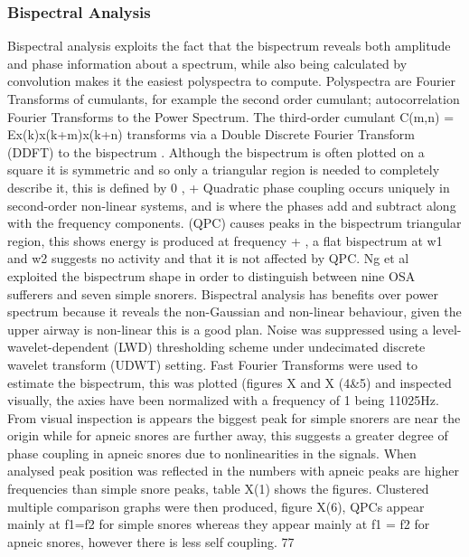 \subsubsection{Bispectral Analysis}
Bispectral analysis exploits the fact that the bispectrum reveals both amplitude and phase information about a spectrum, while also being calculated by convolution makes it the easiest polyspectra to compute. Polyspectra are Fourier Transforms of cumulants, for example the second order cumulant; autocorrelation Fourier Transforms to the Power Spectrum. The third-order cumulant C(m,n) = E{x(k)x(k+m)x(k+n)} transforms via a Double Discrete Fourier Transform (DDFT) to the bispectrum . Although the bispectrum is often plotted on a square it is symmetric and so only a triangular region is needed to completely describe it, this is defined by 0 \le {} \le {},  +  \le \pi
Quadratic phase coupling occurs uniquely in second-order non-linear systems, and is where the phases add and subtract along with the frequency components. 
(QPC) causes peaks in the bispectrum triangular region, this shows energy is produced at frequency  + , a flat bispectrum at w1 and w2 suggests no activity and that it is not affected by QPC. 
Ng et al exploited the bispectrum shape in order to distinguish between nine OSA sufferers and seven simple snorers. Bispectral analysis has benefits over power spectrum because it reveals the non-Gaussian and non-linear behaviour, given the upper airway is non-linear this is a good plan. 
Noise was suppressed using a level-wavelet-dependent (LWD) thresholding scheme under undecimated discrete wavelet transform (UDWT) setting. Fast Fourier Transforms were used to estimate the bispectrum, this was plotted (figures X and X (4&5) and inspected visually, the axies have been normalized with a frequency of 1 being 11025Hz. From visual inspection is appears the biggest peak for simple snorers are near the origin while for apneic snores are further away, this suggests a greater degree of phase coupling in apneic snores due to nonlinearities in the signals. When analysed peak position was reflected in the numbers with apneic peaks are higher frequencies than simple snore peaks, table X(1) shows the figures.
Clustered multiple comparison graphs were then produced, figure X(6), QPCs appear mainly at f1=f2 for simple snores whereas they appear mainly at f1 \not= f2 for apneic snores, however there is less self coupling. 77%

